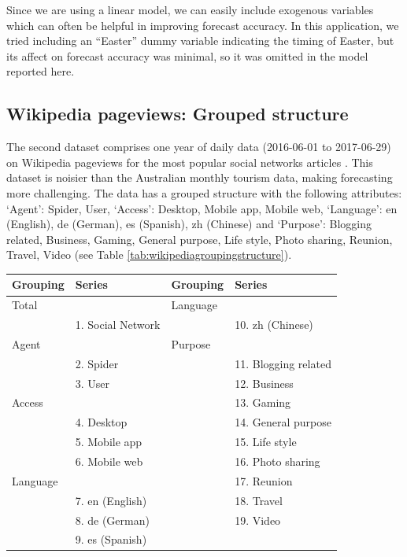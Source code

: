 \documentclass[11pt,a4paper,]{article}
\let\origtable\table
\let\endorigtable\endtable
\renewenvironment{table}[1][2] {
    \expandafter\origtable\expandafter[!htbp]
} {
    \endorigtable
}
\begin{document}
Since we are using a linear model, we can easily include exogenous
variables which can often be helpful in improving forecast accuracy. In
this application, we tried including an ``Easter'' dummy variable
indicating the timing of Easter, but its affect on forecast accuracy was
minimal, so it was omitted in the model reported here.

\FloatBarrier

\hypertarget{wikipedia-pageviews-grouped-structure}{%
\subsection{Wikipedia pageviews: Grouped
structure}\label{wikipedia-pageviews-grouped-structure}}

The second dataset comprises one year of daily data (2016-06-01 to
2017-06-29) on Wikipedia pageviews for the most popular social networks
articles \autocite{ashouri2018}. This dataset is noisier than the
Australian monthly tourism data, making forecasting more challenging.
The data has a grouped structure with the following attributes: `Agent':
Spider, User, `Access': Desktop, Mobile app, Mobile web, `Language': en
(English), de (German), es (Spanish), zh (Chinese) and `Purpose':
Blogging related, Business, Gaming, General purpose, Life style, Photo
sharing, Reunion, Travel, Video (see Table
\ref{tab:wikipediagroupingstructure}).

\begin{table}[t]

\caption{\label{tab:wikipediagroupingstructure}Social networking Wikipedia article grouping structure}
\centering
\begin{tabular}{llll}
\toprule
Grouping & Series & Grouping & Series\\
\midrule
Total &  & Language & \\
 & 1. Social Network &  & 10. zh (Chinese)\\
Agent &  & Purpose & \\
 & 2. Spider &  & 11. Blogging related\\
 & 3. User &  & 12. Business\\
Access &  &  & 13. Gaming\\
 & 4. Desktop &  & 14. General purpose\\
 & 5. Mobile app &  & 15. Life style\\
 & 6. Mobile web &  & 16. Photo sharing\\
Language &  &  & 17. Reunion\\
 & 7. en (English) &  & 18. Travel\\
 & 8. de (German) &  & 19. Video\\
 & 9. es (Spanish) &  & \\
\bottomrule
\end{tabular}
\end{table}
\end{document}
